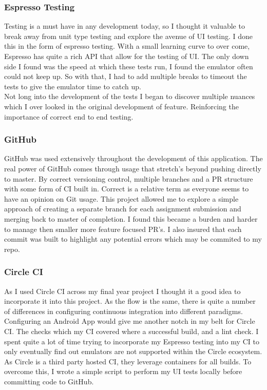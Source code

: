 \subsubsection{ Espresso Testing }
Testing is a must have in any development today, so I thought it valuable to break away from unit type testing and explore the avenue of UI testing. I done this in the form of espresso testing. With a small learning curve to over come, Espresso has quite a rich API that allow for the testing of UI. The only down side I found was the speed at which these tests run, I found the emulator often could not keep up. So with that, I had to add multiple breaks to timeout the tests to give the emulator time to catch up. 
\\Not long into the development of the tests I began to discover multiple nuances which I over looked in the original development of feature. Reinforcing the importance of correct end to end testing.

\subsubsection{  GitHub }
GitHub was used extensively throughout the development of this application. The real power of GitHub comes through usage that stretch's beyond pushing directly to master. By correct versioning control, multiple branches and a PR structure with some form of CI built in. Correct is a relative term as everyone seems to have an opinion on Git usage. This project allowed me to explore a simple approach of creating a separate branch for each assignment submission and merging back to master of completion. I found this became a burden and harder to manage then smaller more feature focused PR's. I also insured that each commit was built to highlight any potential errors which may be commited to my repo.

\subsubsection{  Circle CI }
As I used Circle CI across my final year project I thought it a good idea to incorporate it into this project. As the flow is the same, there is quite a number of differences in configuring continuous integration into different paradigms. Configuring an Android App would give me another notch in my belt for Circle CI. The checks which my CI covered where a successful build, and a lint check. I spent quite a lot of time trying to incorporate my Espresso testing into my CI to only eventually find out emulators are not supported within the Circle ecosystem. As Circle is a third party hosted CI, they leverage containers for all builds. To overcome this, I wrote a simple script to perform my UI tests locally before committing code to GitHub.

